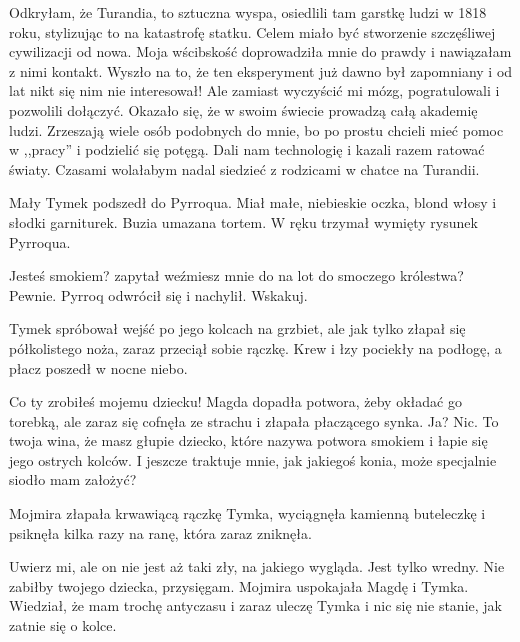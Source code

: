 \begin{dialogue}
Odkryłam, że Turandia, to sztuczna wyspa, osiedlili tam garstkę ludzi w 1818 roku, stylizując to na katastrofę statku.
Celem miało być stworzenie szczęśliwej cywilizacji od nowa. Moja wścibskość doprowadziła mnie do prawdy i nawiązałam z nimi kontakt.
Wyszło na to, że ten eksperyment już dawno był zapomniany i od lat nikt się nim nie interesował!
Ale zamiast wyczyścić mi mózg, pogratulowali i pozwolili dołączyć. 
Okazało się, że w swoim świecie prowadzą całą akademię ludzi. Zrzeszają wiele osób podobnych do mnie, bo po prostu chcieli mieć pomoc w ,,pracy'' i podzielić się potęgą.
Dali nam technologię i kazali razem ratować światy. Czasami wolałabym nadal siedzieć z rodzicami w chatce na Turandii.
\end{dialogue}

Mały Tymek podszedł do Pyrroqua. Miał małe, niebieskie oczka, blond włosy i słodki garniturek.
Buzia umazana tortem.
W ręku trzymał wymięty rysunek Pyrroqua.

\begin{dialogue}
\ds{} Jesteś smokiem? \dm{} zapytał \dm{} weźmiesz mnie do na lot do smoczego królestwa?
\ds{} Pewnie. \dm{} Pyrroq odwrócił się i nachylił. \dm{} Wskakuj.
\end{dialogue}

Tymek spróbował wejść po jego kolcach na grzbiet, ale jak tylko złapał się półkolistego noża, zaraz przeciął sobie rączkę. 
Krew i łzy pociekły na podłogę, a płacz poszedł w nocne niebo. 

\begin{dialogue}
\ds{} Co ty zrobiłeś mojemu dziecku! \dm{} Magda dopadła potwora, żeby okładać go torebką, ale zaraz się cofnęła ze strachu i złapała płaczącego synka.
\ds{} Ja? Nic. To twoja wina, że masz głupie dziecko, które nazywa potwora smokiem i łapie się jego ostrych kolców. 
I jeszcze traktuje mnie, jak jakiegoś konia, może specjalnie siodło mam założyć?
\end{dialogue}

Mojmira złapała krwawiącą rączkę Tymka, wyciągnęła kamienną buteleczkę i psiknęła kilka razy na ranę, która zaraz zniknęła.

\begin{dialogue}
\ds{} Uwierz mi, ale on nie jest aż taki zły, na jakiego wygląda. Jest tylko wredny. Nie zabiłby twojego dziecka, przysięgam. \dm{} Mojmira uspokajała Magdę i Tymka. \dm{}
Wiedział, że mam trochę antyczasu i zaraz uleczę Tymka i nic się nie stanie, jak zatnie się o kolce.
\end{dialogue}

